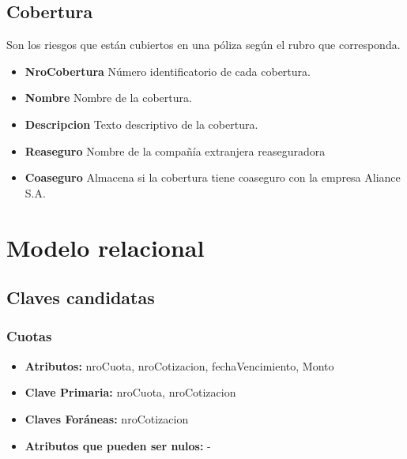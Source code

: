 \documentclass[a4paper,11pt]{article}
\begin{document}
\subsection{Cobertura}

Son los riesgos que están cubiertos en una póliza según el rubro que corresponda.

\begin{itemize}
   
  \item \textbf{NroCobertura} Número identificatorio de cada cobertura.
  
  \item \textbf{Nombre} Nombre de la cobertura.

  \item \textbf{Descripcion} Texto descriptivo de la cobertura.
  
  \item \textbf{Reaseguro} Nombre de la compañía extranjera reaseguradora

  \item \textbf{Coaseguro} Almacena si la cobertura tiene coaseguro con la empresa Aliance S.A.
  
\end{itemize}

\section{Modelo relacional}

\subsection{Claves candidatas}

\subsubsection{Cuotas}

\begin{itemize}

	\item \textbf{Atributos:} nroCuota, nroCotizacion, fechaVencimiento, Monto

	\item \textbf{Clave Primaria:} nroCuota, nroCotizacion

	\item \textbf{Claves Foráneas:} nroCotizacion

	\item \textbf{Atributos que pueden ser nulos:} -
	
\end{itemize}
\end{document}
